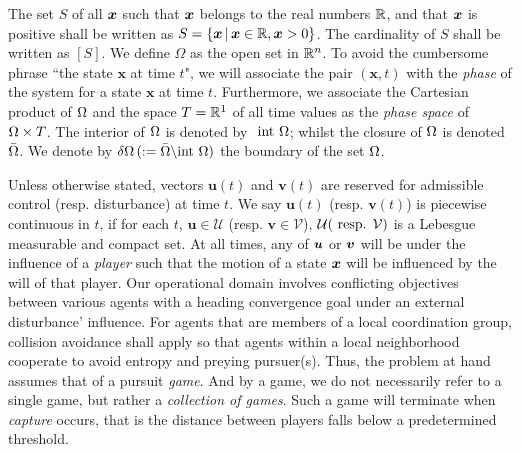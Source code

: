  The set $S$ of all $\bm{x}$ such that $\bm{x}$ belongs to the real numbers  $\mathbb{R}$, and that $\bm{x}$ is positive shall be written as $S=\{\bm{x}\,|\, \bm{x} \in \mathbb{R}, \bm{x} >0\}$. The cardinality of $S$ shall be written as $\left[S\right]$. We define $\Omega$ as the open set in $\mathbb{R}^n$.  To avoid the cumbersome phrase ``the state $\bm{x}$ at time $t$", we will associate the pair $(\bm{x}, t)$ with the \textit{phase} of the system for a state $\bm{x}$ at time $t$. Furthermore, we associate the Cartesian product of $\Omega$ and the space $T =\mathbb{R}^1$ of all time values as the \textit{phase space} of $\Omega \times T$. The interior of $\Omega$ is denoted by $\text{ int } \Omega$; whilst the closure of $\Omega$ is denoted $\bar{\Omega}$. We denote by $\delta \Omega \,(:= \bar{\Omega} \backslash \text{int } \Omega)$ the boundary of the set $\Omega$. 

Unless otherwise stated, vectors $\bm{u}(t)$ and $\bm{v}(t)$ are reserved for admissible control (resp. disturbance) at time $t$. We say $\bm{u}(t)$ (resp. $\bm{v}(t)$) is piecewise continuous in $t$, if for each $t$, $\bm{u} \in \mathcal{U}$ (resp. $\bm{v} \in \mathcal{V}$), $\mathcal{U}(\text{ resp. } \mathcal{V})$ is a Lebesgue measurable and compact set. At all times, any of $\bm{u}$ or $\bm{v}$ will be under the influence of a \textit{player} such that the motion of a state $\bm{x}$ will be influenced by the will of that player. Our operational domain involves conflicting objectives between various agents \eg with a heading convergence goal under an external disturbance' influence. For agents that are members of a local coordination group, collision avoidance shall apply so that  agents within a local neighborhood cooperate to avoid entropy and preying pursuer(s). Thus, the problem at hand assumes that of a pursuit \textit{game}.  And by a game, we do not necessarily refer to a single game, but rather a \textit{collection of games}. Such a game will terminate when \textit{capture} occurs, that is the distance between players falls below a predetermined threshold. 

